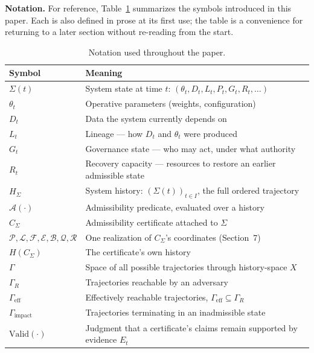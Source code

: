 \documentclass[11pt]{article}
\begin{document}
\bigskip
\noindent\textbf{Notation.} For reference, Table~\ref{tab:notation} summarizes the symbols introduced in this paper. Each is also defined in prose at its first use; the table is a convenience for returning to a later section without re-reading from the start.

\begin{table}[h]
\centering
\begin{tabularx}{\textwidth}{@{}lX@{}}
\toprule
\textbf{Symbol} & \textbf{Meaning} \\
\midrule
$\Sigma(t)$ & System state at time $t$: $(\theta_t, D_t, L_t, P_t, G_t, R_t, \ldots)$ \\
\quad $\theta_t$ & Operative parameters (weights, configuration) \\
\quad $D_t$ & Data the system currently depends on \\
\quad $L_t$ & Lineage --- how $D_t$ and $\theta_t$ were produced \\
\quad $G_t$ & Governance state --- who may act, under what authority \\
\quad $R_t$ & Recovery capacity --- resources to restore an earlier admissible state \\
$H_\Sigma$ & System history: $(\Sigma(t))_{t \in I}$, the full ordered trajectory \\
$\mathcal{A}(\cdot)$ & Admissibility predicate, evaluated over a history \\
$C_\Sigma$ & Admissibility certificate attached to $\Sigma$ \\
\quad $\mathcal{P,L,F,E,B,Q,R}$ & One realization of $C_\Sigma$'s coordinates (Section~7) \\
$H(C_\Sigma)$ & The certificate's own history \\
$\Gamma$ & Space of all possible trajectories through history-space $X$ \\
$\Gamma_R$ & Trajectories reachable by an adversary \\
$\Gamma_{\mathrm{eff}}$ & Effectively reachable trajectories, $\Gamma_{\mathrm{eff}} \subseteq \Gamma_R$ \\
$\Gamma_{\mathrm{impact}}$ & Trajectories terminating in an inadmissible state \\
$\mathrm{Valid}(\cdot)$ & Judgment that a certificate's claims remain supported by evidence $E_t$ \\
\bottomrule
\end{tabularx}
\caption{Notation used throughout the paper.}
\label{tab:notation}
\end{table}
\end{document}
